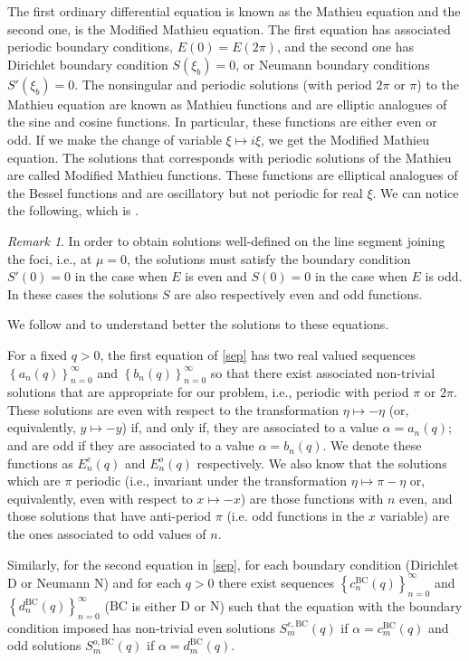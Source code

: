 \documentclass{amsart}
\theoremstyle{definition}
\theoremstyle{remark}
\newtheorem{remark}[theorem]{Remark}
\numberwithin{equation}{section}
\theoremstyle{definition}
\theoremstyle{remark}
\begin{document}
The first ordinary differential equation is known as the Mathieu equation and the second one, is the Modified Mathieu equation. The first equation has associated periodic boundary conditions, $E(0)=E(2\pi)$, and the second one has Dirichlet boundary condition $S(\xi_b)=0$, or Neumann boundary conditions $S'(\xi_b)=0$. The nonsingular and periodic solutions (with period $2\pi$ or $\pi$) to the Mathieu equation are known as Mathieu functions and are elliptic analogues of the sine and cosine functions. In particular, these functions are either even or odd. If we make the change of variable $\xi\mapsto i\xi$, we get the Modified Mathieu equation. The solutions that corresponds with periodic solutions of the Mathieu are called Modified Mathieu functions. These functions are elliptical analogues of the Bessel functions and are oscillatory but not periodic for real $\xi$. We can notice the following, which is \cite[Remark 8]{Hez}.

\begin{remark}\label{remark}
	In order to obtain solutions well-defined on the line segment joining the foci, i.e., at $\mu=0$, the solutions must satisfy the boundary condition $S'(0)=0$ in the case when $E$ is even and $S(0)=0$ in the case when $E$ is odd. In these cases the solutions $S$ are also respectively even and odd functions. 
\end{remark}

We follow \cite{Math} and \cite{Hez} to understand better the solutions to these equations.

For a fixed $q>0$, the first equation of \eqref{sep} has two real valued sequences $\left\{a_n(q)\right\}_{n=0}^\infty$ and $\left\{b_n(q)\right\}_{n=0}^\infty$ so that there exist associated non-trivial solutions that are appropriate for our problem, i.e., periodic with period $\pi$ or $2\pi$. These solutions are even with respect to the transformation $\eta\mapsto-\eta$ (or, equivalently, $y\mapsto -y$) if, and only if, they are associated to a value $\alpha=a_n(q)$; and are odd if they are associated to a value $\alpha=b_n(q)$. We denote these functions as $E_n^e(q)$ and $E_n^o(q)$ respectively. We also know that the solutions which are $\pi$ periodic (i.e., invariant under the transformation $\eta\mapsto\pi-\eta$ or, equivalently, even with respect to $x\mapsto -x$) are those functions with $n$ even, and those solutions that have anti-period $\pi$ (i.e. odd functions in the $x$ variable) are the ones associated to odd values of $n$.

Similarly, for the second equation in \eqref{sep}, for each boundary condition (Dirichlet $\mathrm{D}$ or Neumann $\mathrm{N}$) and for each $q>0$ there exist sequences $\left\{c_n^\mathrm{BC}(q)\right\}_{n=0}^\infty$ and $\left\{d_n^\mathrm{BC}(q)\right\}_{n=0}^\infty$ ($\mathrm{BC}$ is either $\mathrm{D}$ or $\mathrm{N}$) such that the equation with the boundary condition imposed has non-trivial even solutions $S^{e,\mathrm{BC}}_m(q)$ if $\alpha=c_m^\mathrm{BC}(q)$ and odd solutions $S^{o,\mathrm{BC}}_m(q)$ if $\alpha=d_m^\mathrm{BC}(q)$.
\end{document}

